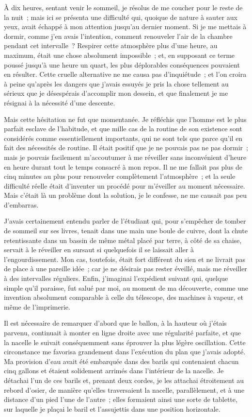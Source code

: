 \documentclass[french,twoside]{book} %
\begin{document}
À dix heures, sentant venir le sommeil, je résolus de me coucher pour le reste de la nuit ; mais ici se présenta une difficulté qui, quoique de nature à sauter aux yeux, avait échappé à mon attention jusqu’au dernier moment. Si je me mettais à dormir, comme j’en avais l’intention, comment renouveler l’air de la chambre pendant cet intervalle ? Respirer cette atmosphère plus d’une heure, au maximum, était une chose absolument impossible ; et, en supposant ce terme poussé jusqu’à une heure un quart, les plus déplorables conséquences pouvaient en résulter. Cette cruelle alternative ne me causa pas d’inquiétude ; et l’on croira à peine qu’après les dangers que j’avais essuyés je pris la chose tellement au sérieux que je désespérais d’accomplir mon dessein, et que finalement je me résignai à la nécessité d’une descente.\par
Mais cette hésitation ne fut que momentanée. Je réfléchis que l’homme est le plus parfait esclave de l’habitude, et que mille cas de la routine de son existence sont considérés comme essentiellement importants, qui ne sont tels que parce qu’il en fait des nécessités de routine. Il était positif que je ne pouvais pas ne pas dormir ; mais je pouvais facilement m’accoutumer à me réveiller sans inconvénient d’heure en heure durant tout le temps consacré à mon repos. Il ne me fallait pas plus de cinq minutes au plus pour renouveler complètement l’atmosphère ; et la seule difficulté réelle était d’inventer un procédé pour m’éveiller au moment nécessaire. Mais c’était là un problème dont la solution, je le confesse, ne me causait pas peu d’embarras.\par
J’avais certainement entendu parler de l’étudiant qui, pour s’empêcher de tomber de sommeil sur ses livres, tenait dans une main une boule de cuivre, dont la chute retentissante dans un bassin de même métal placé par terre, à côté de sa chaise, servait à le réveiller en sursaut si quelquefois il se laissait aller à l’engourdissement. Mon cas, toutefois, était fort différent du sien et ne livrait pas de place à une pareille idée ; car je ne désirais pas rester éveillé, mais me réveiller à des intervalles réguliers. Enfin, j’imaginai l’expédient suivant qui, quelque simple qu’il paraisse, fut salué par moi, au moment de ma découverte, comme une invention absolument comparable à celle du télescope, des machines à vapeur, et même de l’imprimerie.\par
Il est nécessaire de remarquer d’abord que le ballon, à la hauteur où j’étais parvenu, continuait à monter en ligne droite avec une régularité parfaite, et que la nacelle le suivait conséquemment sans éprouver la plus légère oscillation. Cette circonstance me favorisa grandement dans l’exécution du plan que j’avais adopté. Ma provision d’eau avait été embarquée dans des barils qui contenaient chacun cinq gallons et étaient solidement arrimés dans l’intérieur de la nacelle. Je détachai l’un de ces barils et, prenant deux cordes, je les attachai étroitement au rebord d’osier, de manière qu’elles traversaient la nacelle, parallèlement, et à une distance d’un pied l’une de l’autre ; elles formaient ainsi une sorte de tablette, sur laquelle je plaçai le baril et l’assujettis dans une position horizontale.\par
\end{document}
